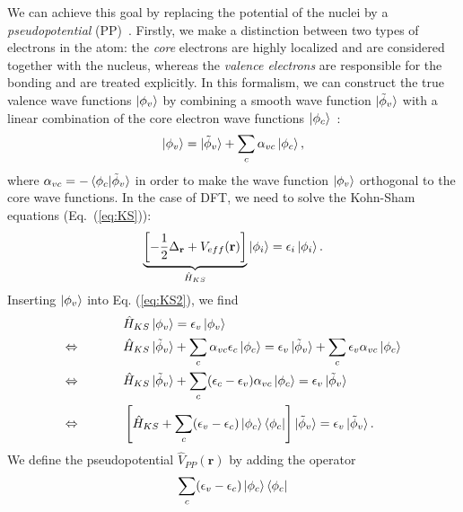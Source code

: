 \begin{refsection}
We can achieve this goal by replacing the potential of the nuclei by a \textit{pseudopotential} (PP)~\cite{Phillips1959}. Firstly, we make a distinction between two types of electrons in the atom: the \textit{core} electrons are highly localized and are considered together with the nucleus, whereas the \textit{valence electrons} are responsible for the bonding and are treated explicitly. In this formalism, we can construct the true valence wave functions $\ket{\phi_v}$ by combining a smooth wave function $\ket{\tilde{\phi}_v}$ with a linear combination of the core electron wave functions $\ket{\phi_c}$~\cite{Kohanoff2006}:
\begin{equation}
\ket{\phi_v} = \ket{\tilde{\phi}_v} + \sum_c \alpha_{vc} \ket{\phi_c}, 
\end{equation}
where $\alpha_{vc} = - \braket{\phi_c | \tilde{\phi}_v}$ in order to make the wave function $\ket{\phi_v}$ orthogonal to the core wave functions. In the case of DFT, we need to solve the Kohn-Sham equations (Eq.~(\ref{eq:KS})):
\begin{equation}\label{eq:KS2}
\underbrace{\left[- \frac{1}{2} \Delta_{\mathbf{r}} + V_{eff}(\mathbf{r}) \right]}_{\hat{H}_{KS} } \ket{\phi_i} = \epsilon_i \ket{\phi_i}.
\end{equation}
Inserting $\ket{\phi_v}$ into Eq. (\ref{eq:KS2}), we find
\begin{align*}
&\hspace{0.5in}\hat{H}_{KS} \ket{\phi_v} = \epsilon_v \ket{\phi_v} 
\\ \Leftrightarrow &\hspace{0.5in} \hat{H}_{KS} \ket{\tilde{\phi}_v} + \sum_c \alpha_{vc} \epsilon_c \ket{\phi_c} = \epsilon_v \ket{\tilde{\phi}_v} +  \sum_c \epsilon_v \alpha_{vc}  \ket{\phi_c}
\\ \Leftrightarrow &\hspace{0.5in} \hat{H}_{KS} \ket{\tilde{\phi}_v} + \sum_c (\epsilon_c - \epsilon_v) \alpha_{vc}  \ket{\phi_c} = \epsilon_v \ket{\tilde{\phi}_v}
\\ \Leftrightarrow &\hspace{0.5in} \left[ \hat{H}_{KS} + \sum_c (\epsilon_v - \epsilon_c) \ket{\phi_c} \bra{\phi_c} \right] \ket{\tilde{\phi}_v} = \epsilon_v \ket{\tilde{\phi}_v}.
\end{align*}
We define the pseudopotential $\hat{V}_{PP}(\mathbf{r})$ by adding the operator
\begin{equation*}
\sum_c (\epsilon_v - \epsilon_c) \ket{\phi_c} \bra{\phi_c}
\end{equation*}

\end{refsection}
